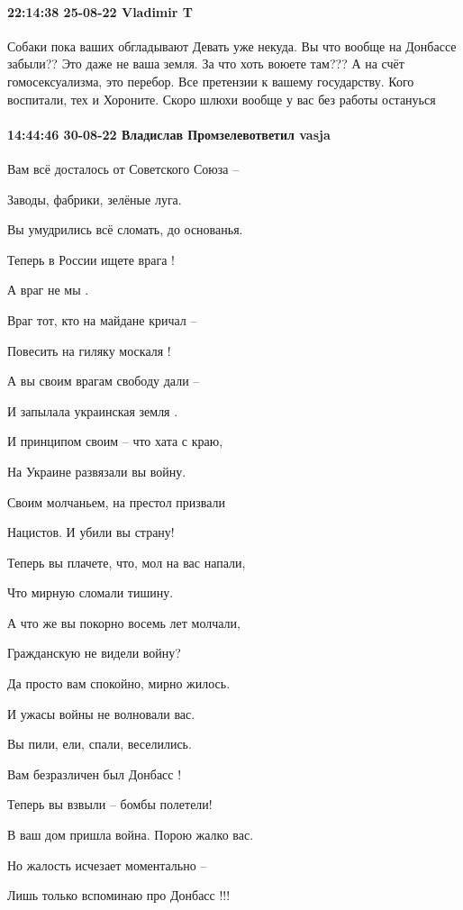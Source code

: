 \paragraph{22:14:38 25-08-22 Vladimir T}

Собаки пока ваших обгладывают
Девать уже некуда.
Вы что вообще на Донбассе забыли??
Это даже не ваша земля.
За что хоть воюете там???
А на счёт гомосексуализма, это перебор.
Все претензии к вашему государству.
Кого воспитали, тех и Хороните.
Скоро шлюхи вообще у вас без работы остануься🤣🤣🤣🤣

\paragraph{14:44:46 30-08-22 Владислав Промзелевответил vasja}

Вам всё досталось от Советского Союза – 

Заводы, фабрики, зелёные луга.

Вы умудрились всё сломать, до основанья.

Теперь в России ищете врага !

 А враг не мы .

Враг тот, кто на майдане кричал – 

Повесить на гиляку москаля !

А вы своим врагам свободу дали – 

И запылала украинская земля .

 И принципом своим – что хата с краю,

На Украине развязали вы войну.

Своим молчаньем, на престол призвали

Нацистов. И убили вы страну!

 Теперь вы плачете, что, мол на вас напали,

Что мирную сломали тишину.

А что же вы покорно восемь лет молчали,

Гражданскую не видели войну?

 Да просто вам спокойно, мирно жилось.

И ужасы войны не волновали вас.

Вы пили, ели, спали, веселились.

Вам безразличен был Донбасс !

 Теперь вы взвыли – бомбы полетели!

В ваш дом пришла война. Порою жалко вас.

Но жалость исчезает моментально – 

Лишь только вспоминаю про Донбасс !!!


